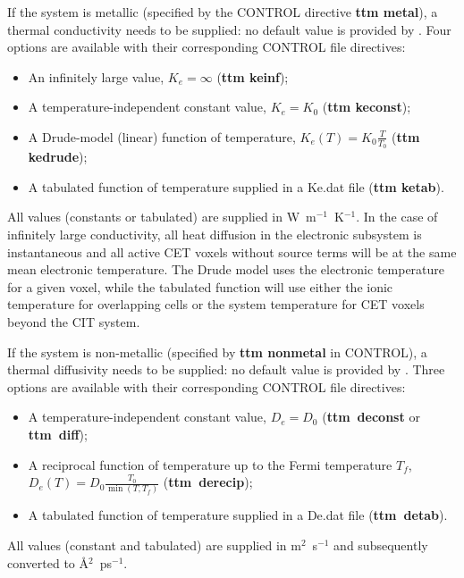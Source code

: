 If the system is metallic (specified by the CONTROL directive {\bf ttm metal}), 
a thermal conductivity 
needs to be supplied: no default value is provided by \D. 
Four options are available with their corresponding CONTROL file directives:
\begin{itemize}
\item An infinitely large value, $K_e = \infty$ ({\bf ttm keinf});
\item A temperature-independent constant value, $K_e = K_0$ ({\bf ttm keconst});
\item A Drude-model (linear) function of temperature, $K_e (T) = K_0 \frac{T}{T_0}$ ({\bf ttm kedrude});
\item A tabulated function of temperature supplied in a Ke.dat file ({\bf ttm ketab}).
\end{itemize}
All values (constants or tabulated) are supplied in W~m$^{-1}$~K$^{-1}$. 
In the case of infinitely large conductivity, all heat diffusion in the electronic 
subsystem is instantaneous and all active CET voxels without source terms 
will be at the same mean electronic temperature. The Drude model uses the 
electronic temperature for a given voxel, while the tabulated function will use 
either the ionic temperature for overlapping cells or the system temperature 
for CET voxels beyond the CIT system. 

If the system is non-metallic (specified by {\bf ttm nonmetal} in CONTROL), 
a thermal diffusivity 
needs to be supplied: no default value is provided by \D. 
Three options are available with their corresponding CONTROL file directives:
\begin{itemize}
\item A temperature-independent constant value, $D_e = D_0$ ({\bf ttm~deconst} or {\bf ttm~diff});
\item A reciprocal function of temperature up to the Fermi temperature $T_{f}$, $D_e (T) = D_0 \frac{T_0}{\min \left(T, T_{f}\right)}$ ({\bf ttm~derecip});
\item A tabulated function of temperature supplied in a De.dat file ({\bf ttm~detab}).
\end{itemize}
All values (constant and tabulated) are supplied in m$^2$~s$^{-1}$ and 
subsequently converted to \AA$^2$~ps$^{-1}$.


